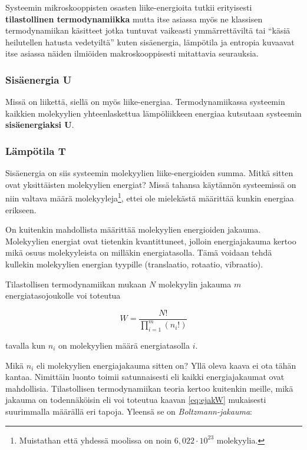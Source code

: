 \documentclass[12pt,a4paper,finnish]{book}
\begin{document}
Systeemin mikroskooppisten osasten liike-energioita tutkii erityisesti \textbf{tilastollinen termodynamiikka} mutta itse asiassa 
myös ne klassisen termodynamiikan käsitteet jotka tuntuvat vaikeasti ymmärrettäviltä tai ``käsiä heilutellen hatusta vedetyiltä'' 
kuten sisäenergia, lämpötila ja entropia kuvaavat itse asiassa näiden ilmiöiden makroskooppisesti mitattavia seurauksia.

\subsubsection{Sisäenergia U}

Missä on liikettä, siellä on myös liike-energiaa. Termodynamiikassa systeemin kaikkien molekyylien yhteenlaskettua lämpöliikkeen 
energiaa kutsutaan systeemin \textbf{sisäenergiaksi U}. 

\subsubsection{Lämpötila T}

Sisäenergia on siis systeemin molekyylien liike-energioiden summa. Mitkä sitten ovat yksittäisten molekyylien energiat? 
Missä tahansa käytännön systeemissä on niin valtava määrä molekyyleja\footnote{Muistathan että yhdessä moolissa on 
noin $6,022\cdot10^{23}$ molekyylia.}, ettei ole mielekästä määrittää kunkin energiaa erikseen.

On kuitenkin mahdollista määrittää molekyylien energioiden jakauma. Molekyylien energiat ovat tietenkin kvantittuneet, 
jolloin energiajakauma kertoo mikä osuus molekyyleista on milläkin energiatasolla. Tämä voidaan tehdä kullekin molekyylien 
energian tyypille (translaatio, rotaatio, vibraatio).

Tilastollisen termodynamiikan mukaan $N$ molekyylin jakauma $m$ energiatasojoukolle voi toteutua

\begin{equation}
\label{eq:ejakW}
 W = \frac{N!}{\prod_{i=1}^m(n_i!)}
\end{equation}

tavalla kun $n_i$ on molekyylien määrä energiatasolla $i$.

Mikä $n_i$ eli molekyylien energiajakauma sitten on? Yllä oleva kaava ei ota tähän kantaa. 
Nimittäin luonto toimii satunnaisesti eli kaikki energiajakaumat ovat mahdollisia. Tilastollisen termodynamiikan 
teoria kertoo kuitenkin meille, mikä jakauma on todennäköisin eli voi toteutua kaavan \ref{eq:ejakW} mukaisesti 
suurimmalla määrällä eri tapoja. Yleensä se on \textit{Boltzmann-jakauma}:
\end{document}
